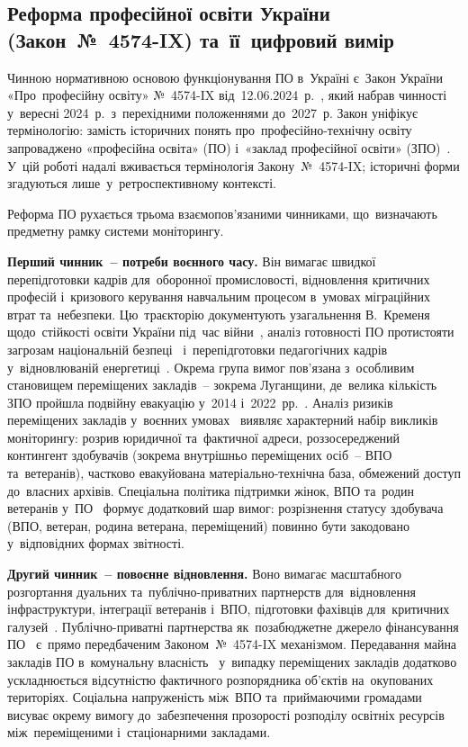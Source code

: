 \subsection{Реформа професійної освіти України (Закон~№~4574-IX) та~її~цифровий вимір}
\label{sec:p1-reform}
\label{sec:p1-impl-drivers}

Чинною нормативною основою функціонування ПО в~Україні є~Закон України «Про~професійну освіту» №~4574-IX від~12.06.2024~р.~\cite{Zakon4574IX}, який набрав чинності у~вересні 2024~р.\ з~перехідними положеннями до~2027~р. Закон уніфікує термінологію: замість історичних понять про~професійно-технічну освіту запроваджено «професійна освіта» (ПО) і~«заклад професійної освіти» (ЗПО)~\cite{Kostrytsia2025VETRecovery}. У~цій роботі надалі вживається термінологія Закону~№~4574-IX; історичні форми згадуються лише~у~ретроспективному контексті.

Реформа ПО рухається трьома взаємопов'язаними чинниками, що~визначають предметну рамку системи моніторингу.

\textbf{Перший чинник~-- потреби воєнного часу.} Він вимагає швидкої перепідготовки кадрів для~оборонної промисловості, відновлення критичних професій і~кризового керування навчальним процесом в~умовах міграційних втрат та~небезпеки. Цю~траєкторію документують узагальнення В.~Кременя щодо~стійкості освіти України під~час війни~\cite{Kremen2024EduWar, Kremen2024PedagogicalWar}, аналіз готовності ПО протистояти загрозам національній безпеці~\cite{Radkevych2022Threats} і~перепідготовки педагогічних кадрів у~відновлюваній енергетиці~\cite{Radkevych2022Renewables}. Окрема група вимог пов'язана з~особливим становищем переміщених закладів~-- зокрема Луганщини, де~велика кількість ЗПО пройшла подвійну евакуацію у~2014 і~2022~рр.~\cite{NMTsPTO2025}. Аналіз ризиків переміщених закладів у~воєнних умовах~\cite{Bazhan2025PPTERisks} виявляє характерний набір викликів моніторингу: розрив юридичної та~фактичної адреси, роззосереджений контингент здобувачів (зокрема внутрішньо переміщених осіб~-- ВПО та~ветеранів), частково евакуйована матеріально-технічна база, обмежений доступ до~власних архівів. Спеціальна політика підтримки жінок, ВПО та~родин ветеранів у~ПО~\cite{Cherniakova2025WomenVET} формує додатковий шар вимог: розрізнення статусу здобувача (ВПО, ветеран, родина ветерана, переміщений) повинно бути закодовано у~відповідних формах звітності.

\textbf{Другий чинник~-- повоєнне відновлення.} Воно вимагає масштабного розгортання дуальних та~публічно-приватних партнерств для~відновлення інфраструктури, інтеграції ветеранів і~ВПО, підготовки фахівців для~критичних галузей~\cite{Kostrytsia2025VETRecovery}. Публічно-приватні партнерства як~позабюджетне джерело фінансування ПО~\cite{Kryshchenko2024PPP, Radkevych2023PPP} є~прямо передбаченим Законом~№~4574-IX механізмом. Передавання майна закладів ПО в~комунальну власність~\cite{Barabash2024Decentralisation} у~випадку переміщених закладів додатково ускладнюється відсутністю фактичного розпорядника об'єктів на~окупованих територіях. Соціальна напруженість між~ВПО та~приймаючими громадами~\cite{Oliinyk2025IDP} висуває окрему вимогу до~забезпечення прозорості розподілу освітніх ресурсів між~переміщеними і~стаціонарними закладами.

